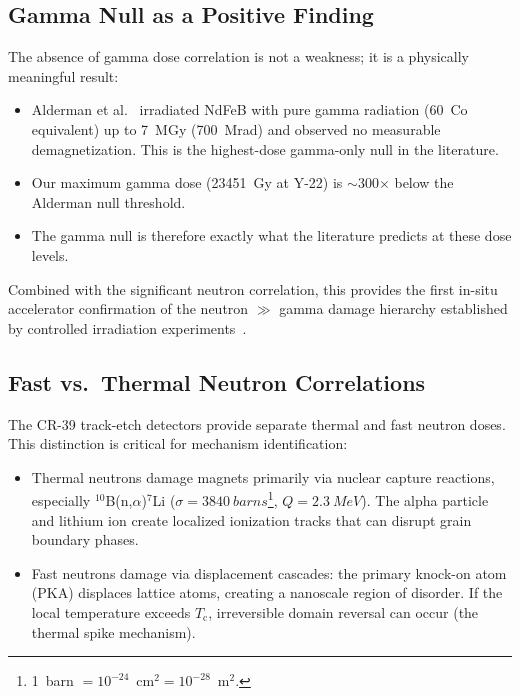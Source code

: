 \documentclass[11pt,letterpaper]{article}
\newcommand{\Tc}{T_\mathrm{c}}
\begin{document}
\subsection{Gamma Null as a Positive Finding}
\label{sec:gamma_null}

The absence of gamma dose correlation is not a weakness; it is a
physically meaningful result:

\begin{itemize}
    \item Alderman et al.~\cite{Alderman} irradiated NdFeB with pure
    gamma radiation (\SI{60}{Co} equivalent) up to \SI{7}{MGy} (700~Mrad) and
    observed no measurable demagnetization. This is the highest-dose
    gamma-only null in the literature.
    \item Our maximum gamma dose (\SI{23451}{Gy} at Y-22) is
    $\sim$300$\times$ below the Alderman null threshold.
    \item The gamma null is therefore exactly what the literature predicts at
    these dose levels.
\end{itemize}

Combined with the significant neutron correlation, this provides the
first in-situ accelerator confirmation of the neutron $\gg$ gamma
damage hierarchy established by controlled irradiation
experiments~\cite{Shen2018,Alderman,APSLS290}.

\subsection{Fast vs.\ Thermal Neutron Correlations}
\label{sec:fast_thermal}

The CR-39 track-etch detectors provide separate thermal and fast neutron
doses. This distinction is critical for mechanism identification:
\begin{itemize}
    \item Thermal neutrons damage magnets primarily via nuclear
    capture reactions, especially ${}^{10}$B(n,$\alpha$)${}^{7}$Li ($\sigma =
    \SI{3840}{barns}$\footnote{1~barn $= 10^{-24}$~cm$^2 = 10^{-28}$~m$^2$.}, $Q = \SI{2.3}{MeV}$). The alpha particle and lithium
    ion create localized ionization tracks that can disrupt grain boundary
    phases.
    \item Fast neutrons damage via displacement cascades: the primary
    knock-on atom (PKA) displaces lattice atoms, creating a nanoscale region
    of disorder. If the local temperature exceeds $\Tc$, irreversible domain
    reversal can occur (the thermal spike mechanism).
\end{itemize}
\end{document}
